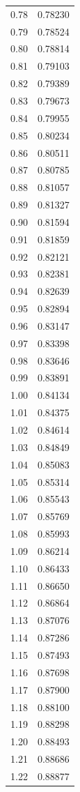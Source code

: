 \documentclass[
  letterpaper,
  DIV=11,
  numbers=noendperiod]{scrartcl}
\begin{document}
\begin{longtable}[]{@{}cc@{}}
0.78 & 0.78230 \\
0.79 & 0.78524 \\
0.80 & 0.78814 \\
0.81 & 0.79103 \\
0.82 & 0.79389 \\
0.83 & 0.79673 \\
0.84 & 0.79955 \\
0.85 & 0.80234 \\
0.86 & 0.80511 \\
0.87 & 0.80785 \\
0.88 & 0.81057 \\
0.89 & 0.81327 \\
0.90 & 0.81594 \\
0.91 & 0.81859 \\
0.92 & 0.82121 \\
0.93 & 0.82381 \\
0.94 & 0.82639 \\
0.95 & 0.82894 \\
0.96 & 0.83147 \\
0.97 & 0.83398 \\
0.98 & 0.83646 \\
0.99 & 0.83891 \\
1.00 & 0.84134 \\
1.01 & 0.84375 \\
1.02 & 0.84614 \\
1.03 & 0.84849 \\
1.04 & 0.85083 \\
1.05 & 0.85314 \\
1.06 & 0.85543 \\
1.07 & 0.85769 \\
1.08 & 0.85993 \\
1.09 & 0.86214 \\
1.10 & 0.86433 \\
1.11 & 0.86650 \\
1.12 & 0.86864 \\
1.13 & 0.87076 \\
1.14 & 0.87286 \\
1.15 & 0.87493 \\
1.16 & 0.87698 \\
1.17 & 0.87900 \\
1.18 & 0.88100 \\
1.19 & 0.88298 \\
1.20 & 0.88493 \\
1.21 & 0.88686 \\
1.22 & 0.88877 \\

\end{longtable}
\end{document}
